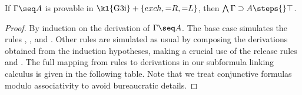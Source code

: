 \begin{theorem}
  If $\Gamma \seq A$ is provable in $\text{\kl{G3i}} + \{exch, {=}R, {=}L\}$,
  then $\bigwedge \Gamma \limp A \steps{} \top$.
\end{theorem}
\begin{proof}
  By induction on the derivation of $\Gamma \seq A$. The base case simulates the
  rules {}, {}, {} and {}. Other rules
  are simulated as usual by composing the derivations obtained from the
  induction hypotheses, making a crucial use of the release rules {}
  and {}. The full mapping from  rules to
  derivations in our subformula linking calculus is given in the following
  table. Note that we treat conjunctive formulas modulo associativity to avoid
  bureaucratic details.


\end{proof}
